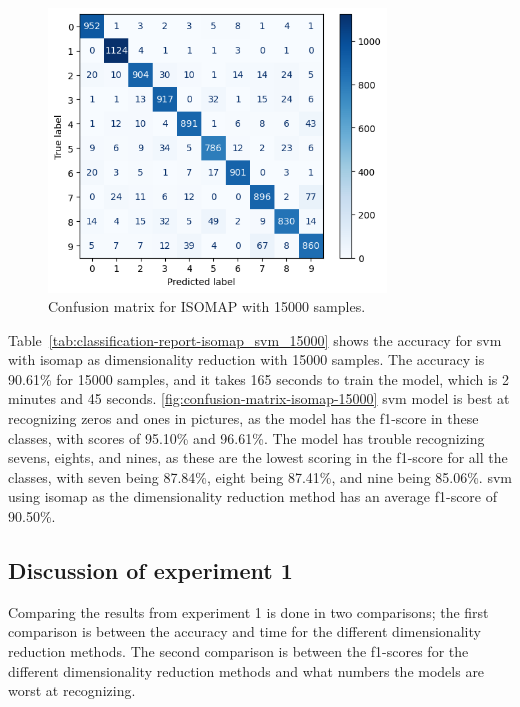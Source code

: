 \begin{figure}[htb!]
    \centering
    \includegraphics[width=0.8\textwidth]{figures/1-experiment/confusion_matrix_isomap_svm_15000.png}
    \caption{Confusion matrix for ISOMAP with 15000 samples.}
    \label{fig:confusion-matrix-isomap-15000}
\end{figure}


Table~\ref{tab:classification-report-isomap_svm_15000} shows the accuracy for \gls{svm} with \gls{isomap} as dimensionality reduction with 15000 samples. The accuracy is 90.61\% for 15000 samples, and it takes 165 seconds to train the model, which is 2 minutes and 45 seconds. \autoref{fig:confusion-matrix-isomap-15000} \gls{svm} model is best at recognizing zeros and ones in pictures, as the model has the f1-score in these classes, with scores of 95.10\% and 96.61\%. The model has trouble recognizing sevens, eights, and nines, as these are the lowest scoring in the f1-score for all the classes, with seven being 87.84\%, eight being 87.41\%, and nine being 85.06\%. \gls{svm} using \gls{isomap} as the dimensionality reduction method has an average f1-score of 90.50\%.

\subsection{Discussion of experiment 1}\label{sec:discussion-experiment-1}
Comparing the results from experiment 1 is done in two comparisons; the first comparison is between the accuracy and time for the different dimensionality reduction methods. The second comparison is between the f1-scores for the different dimensionality reduction methods and what numbers the models are worst at recognizing.

